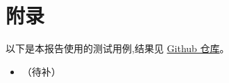 \documentclass{article}
\begin{document}
\maketitle

\begin{abstract}
\end{abstract}

\thispagestyle{empty} %

\newpage
\tableofcontents

\newpage

\begin{markdown}
\end{markdown}

\newpage
\section{附录}

\appendix

以下是本报告使用的测试用例,结果见 \href{https://github.com/QA-Team-lo/dbtest}{Github 仓库}。

\begin{itemize}
    \item （待补）
\end{itemize}

\end{document}
